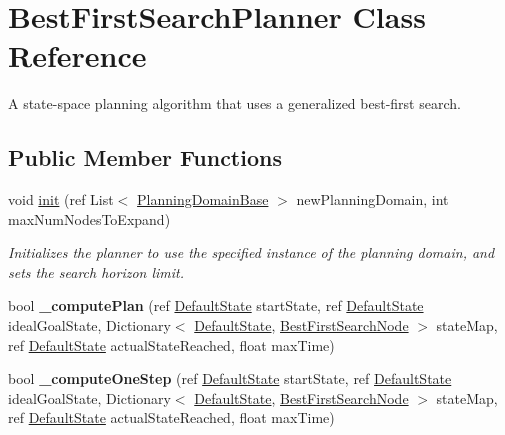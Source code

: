 \hypertarget{class_best_first_search_planner}{\section{Best\-First\-Search\-Planner Class Reference}
\label{class_best_first_search_planner}
}


A state-\/space planning algorithm that uses a generalized best-\/first search.  


\subsection*{Public Member Functions}
\begin{DoxyCompactItemize}
\item 
\hypertarget{class_best_first_search_planner_a00c06f79faf00907ec4906086c37776f}{void \hyperlink{class_best_first_search_planner_a00c06f79faf00907ec4906086c37776f}{init} (ref List$<$ \hyperlink{class_planning_domain_base}{Planning\-Domain\-Base} $>$ new\-Planning\-Domain, int max\-Num\-Nodes\-To\-Expand)}\label{class_best_first_search_planner_a00c06f79faf00907ec4906086c37776f}

\begin{DoxyCompactList}\small\item\em Initializes the planner to use the specified instance of the planning domain, and sets the search horizon limit. \end{DoxyCompactList}\item 
\hypertarget{class_best_first_search_planner_ab9066bb695cb64fc787f747a4972d878}{bool {\bfseries \-\_\-compute\-Plan} (ref \hyperlink{class_default_state}{Default\-State} start\-State, ref \hyperlink{class_default_state}{Default\-State} ideal\-Goal\-State, Dictionary$<$ \hyperlink{class_default_state}{Default\-State}, \hyperlink{class_best_first_search_node}{Best\-First\-Search\-Node} $>$ state\-Map, ref \hyperlink{class_default_state}{Default\-State} actual\-State\-Reached, float max\-Time)}\label{class_best_first_search_planner_ab9066bb695cb64fc787f747a4972d878}

\item 
\hypertarget{class_best_first_search_planner_a97dc3cad80e236bde9c7d9c44759c7ba}{bool {\bfseries \-\_\-compute\-One\-Step} (ref \hyperlink{class_default_state}{Default\-State} start\-State, ref \hyperlink{class_default_state}{Default\-State} ideal\-Goal\-State, Dictionary$<$ \hyperlink{class_default_state}{Default\-State}, \hyperlink{class_best_first_search_node}{Best\-First\-Search\-Node} $>$ state\-Map, ref \hyperlink{class_default_state}{Default\-State} actual\-State\-Reached, float max\-Time)}\label{class_best_first_search_planner_a97dc3cad80e236bde9c7d9c44759c7ba}


\end{DoxyCompactItemize}
